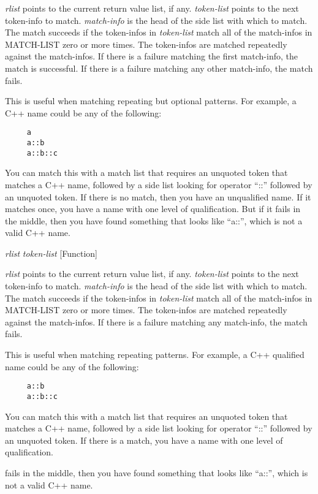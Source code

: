\begin{doc-string}
\emph{rlist} points to the current return value list, if any.  \emph{token-list} points to
the next token-info to match.  \emph{match-info} is the head of the side list with
which to match.  The match succeeds if the token-infos in \emph{token-list} match all
of the match-infos in MATCH-LIST zero or more times.  The token-infos are
matched repeatedly against the match-infos.  If there is a failure matching the
first match-info, the match is successful.  If there is a failure matching any
other match-info, the match fails.

This is useful when matching repeating but optional patterns.  For example, a
C++ name could be any of the following:

\small{\begin{verbatim}
     a
     a::b
     a::b::c
\end{verbatim}}

You can match this with a match list that requires an unquoted token that
matches a C++ name, followed by a side list looking for operator ``::'' followed
by an unquoted token.  If there is no match, then you have an unqualified name.
If it matches once, you have a name with one level of qualification.  But if it
fails in the middle, then you have found something that looks like ``a::'',
which is not a valid C++ name.
\end{doc-string}

\vspace{1em}
\noindent
{}
\usebox{\funcname}\emph{rlist} \emph{token-list}
 \hfill [Function]
\hspace*{\wd\funcname}

\begin{doc-string}
\emph{rlist} points to the current return value list, if any.  \emph{token-list} points to
the next token-info to match.  \emph{match-info} is the head of the side list with
which to match.  The match succeeds if the token-infos in \emph{token-list} match all
of the match-infos in MATCH-LIST zero or more times.  The token-infos are
matched repeatedly against the match-infos.  If there is a failure matching any
match-info, the match fails.

This is useful when matching repeating patterns.  For example, a
C++ qualified name could be any of the following:

\small{\begin{verbatim}
     a::b
     a::b::c
\end{verbatim}}

You can match this with a match list that requires an unquoted token that
matches a C++ name, followed by a side list looking for operator ``::'' followed
by an unquoted token.   If there is a match, you have a name with one level of qualification.

fails in the middle, then you have found something that looks like ``a::'',
which is not a valid C++ name.
\end{doc-string}


